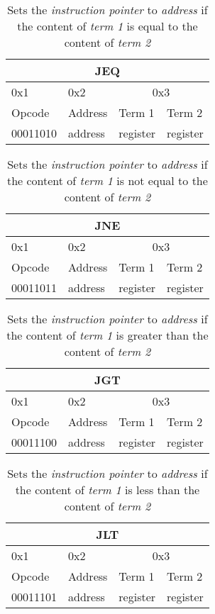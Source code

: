 \documentclass{article}
\begin{document}
\begin{table}[H]
  \centering
  \begin{tabular} { | p{2cm} | | p{2cm} | | p{2cm} | | p{2cm} |}
    \hline
    \multicolumn{4}{|c|}{JEQ}\\
    \hline
    0x1 & 0x2 & \multicolumn{2}{|c|}{0x3}\\
    \hline
    Opcode & Address & Term 1 & Term 2\\
    00011010 & address & register & register \\
    \hline
  \end{tabular}
  \caption{Sets the \textit{instruction pointer} to \textit{address} if the content of \textit{term 1} is equal to the content of \textit{term 2}}
\end{table}

\begin{table}[H]
  \centering
  \begin{tabular} { | p{2cm} | | p{2cm} | | p{2cm} | | p{2cm} |}
    \hline
    \multicolumn{4}{|c|}{JNE}\\
    \hline
    0x1 & 0x2 & \multicolumn{2}{|c|}{0x3}\\
    \hline
    Opcode & Address & Term 1 & Term 2\\
    00011011 & address & register & register \\
    \hline
  \end{tabular}
  \caption{Sets the \textit{instruction pointer} to \textit{address} if the content of \textit{term 1} is not equal to the content of \textit{term 2}}
\end{table}

\begin{table}[H]
  \centering
  \begin{tabular} { | p{2cm} | | p{2cm} | | p{2cm} | | p{2cm} |}
    \hline
    \multicolumn{4}{|c|}{JGT}\\
    \hline
    0x1 & 0x2 & \multicolumn{2}{|c|}{0x3}\\
    \hline
    Opcode & Address & Term 1 & Term 2\\
    00011100 & address & register & register \\
    \hline
  \end{tabular}
  \caption{Sets the \textit{instruction pointer} to \textit{address} if the content of \textit{term 1} is greater than the content of \textit{term 2}}
\end{table}

\begin{table}[H]
  \centering
  \begin{tabular} { | p{2cm} | | p{2cm} | | p{2cm} | | p{2cm} |}
    \hline
    \multicolumn{4}{|c|}{JLT}\\
    \hline
    0x1 & 0x2 & \multicolumn{2}{|c|}{0x3}\\
    \hline
    Opcode & Address & Term 1 & Term 2\\
    00011101 & address & register & register \\
    \hline
  \end{tabular}
  \caption{Sets the \textit{instruction pointer} to \textit{address} if the content of \textit{term 1} is less than the content of \textit{term 2}}
\end{table}
\end{document}

